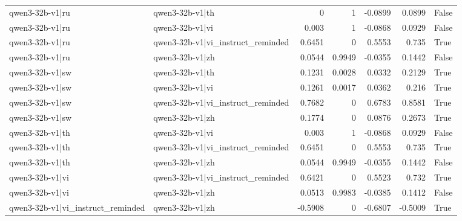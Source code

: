 \begin{table}
\begin{tabular}{l l r r r r l}
qwen3-32b-v1|ru & qwen3-32b-v1|th & 0 & 1 & -0.0899 & 0.0899 & False \\
qwen3-32b-v1|ru & qwen3-32b-v1|vi & 0.003 & 1 & -0.0868 & 0.0929 & False \\
qwen3-32b-v1|ru & qwen3-32b-v1|vi_instruct_reminded & 0.6451 & 0 & 0.5553 & 0.735 & True \\
qwen3-32b-v1|ru & qwen3-32b-v1|zh & 0.0544 & 0.9949 & -0.0355 & 0.1442 & False \\
qwen3-32b-v1|sw & qwen3-32b-v1|th & 0.1231 & 0.0028 & 0.0332 & 0.2129 & True \\
qwen3-32b-v1|sw & qwen3-32b-v1|vi & 0.1261 & 0.0017 & 0.0362 & 0.216 & True \\
qwen3-32b-v1|sw & qwen3-32b-v1|vi_instruct_reminded & 0.7682 & 0 & 0.6783 & 0.8581 & True \\
qwen3-32b-v1|sw & qwen3-32b-v1|zh & 0.1774 & 0 & 0.0876 & 0.2673 & True \\
qwen3-32b-v1|th & qwen3-32b-v1|vi & 0.003 & 1 & -0.0868 & 0.0929 & False \\
qwen3-32b-v1|th & qwen3-32b-v1|vi_instruct_reminded & 0.6451 & 0 & 0.5553 & 0.735 & True \\
qwen3-32b-v1|th & qwen3-32b-v1|zh & 0.0544 & 0.9949 & -0.0355 & 0.1442 & False \\
qwen3-32b-v1|vi & qwen3-32b-v1|vi_instruct_reminded & 0.6421 & 0 & 0.5523 & 0.732 & True \\
qwen3-32b-v1|vi & qwen3-32b-v1|zh & 0.0513 & 0.9983 & -0.0385 & 0.1412 & False \\
qwen3-32b-v1|vi_instruct_reminded & qwen3-32b-v1|zh & -0.5908 & 0 & -0.6807 & -0.5009 & True \\
\bottomrule
\end{tabular}
\end{table}
